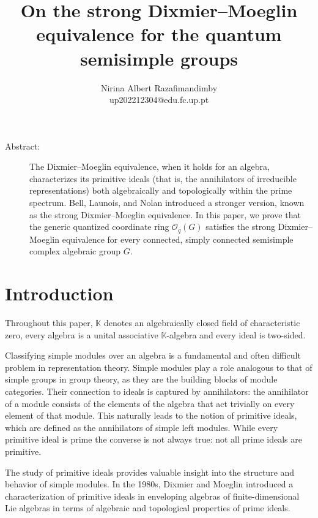 \documentclass[11pt]{article}
\theoremstyle{definition}
\numberwithin{equation}{section}
\newcommand{\KK}{\mathbb{K}}
\newcommand{\qu}{\mathcal{O}}
\begin{document}
 
\title{On the strong Dixmier--Moeglin equivalence for the quantum semisimple groups}
\author{Nirina Albert Razafimandimby\\ up202212304@edu.fc.up.pt}
\date{}


	
	\maketitle
	
	\begin{description}
		\item[ Abstract:] 
		The Dixmier--Moeglin equivalence, when it holds for an algebra, characterizes its primitive ideals (that is,  the annihilators of irreducible representations) both algebraically and topologically within the prime spectrum. Bell, Launois, and Nolan \cite{BLN17} introduced a stronger version, known as the strong Dixmier--Moeglin equivalence. In this paper, we prove that the generic quantized coordinate ring $\qu_q(G)$ satisfies the strong Dixmier--Moeglin  equivalence for every connected, simply connected semisimple complex algebraic group $G$.
	\end{description}

\section{Introduction}
Throughout this paper, $\KK$ denotes an algebraically closed field of characteristic zero, every algebra is a unital associative $\KK$-algebra and every ideal is two-sided.


Classifying simple modules over an algebra is a fundamental and often difficult problem in representation theory. Simple modules play a role analogous to that of simple groups in group theory, as they are the building blocks of module categories. Their connection to ideals is captured by annihilators: the annihilator of a module consists of the elements of the algebra that act trivially on every element of that module. This naturally leads to the notion of primitive ideals, which are defined as the annihilators of simple left modules. While every primitive ideal is prime the converse is not always true: not all prime ideals are primitive.

The study of primitive ideals provides valuable insight into the structure and behavior of simple modules. In the 1980s, Dixmier and Moeglin introduced a characterization of primitive ideals in enveloping algebras of finite-dimensional Lie algebras in terms of algebraic and  topological properties of prime ideals. 
\end{document}
